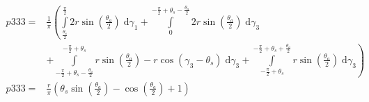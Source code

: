 \begin{align}
    p333 =&\frac{1}{\pi} \left(\int\limits_{\frac{\theta_{s}}{2}}^{\frac{\pi}{2}}2 r \sin{\left (\frac{\theta_{a}}{2} \right )}\;\mathrm{d}\gamma_{1}+\int\limits_{0}^{- \frac{\pi}{2} + \theta_{s} - \frac{\theta_{a}}{2}}2 r \sin{\left (\frac{\theta_{a}}{2} \right )}\;\mathrm{d}\gamma_{3}\right.\\
 &\left.+\int\limits_{- \frac{\pi}{2} + \theta_{s} - \frac{\theta_{a}}{2}}^{- \frac{\pi}{2} + \theta_{s}}r \sin{\left (\frac{\theta_{a}}{2} \right )} - r \cos{\left (\gamma_{3} - \theta_{s} \right )}\;\mathrm{d}\gamma_{3}+\int\limits_{- \frac{\pi}{2} + \theta_{s}}^{- \frac{\pi}{2} + \theta_{s} + \frac{\theta_{a}}{2}}r \sin{\left (\frac{\theta_{a}}{2} \right )}\;\mathrm{d}\gamma_{3}\right)\\
    p333 =& \frac{r}{\pi} \left(\theta_{s} \sin{\left (\frac{\theta_{a}}{2} \right )} - \cos{\left (\frac{\theta_{a}}{2} \right )} + 1\right)
\end{align}